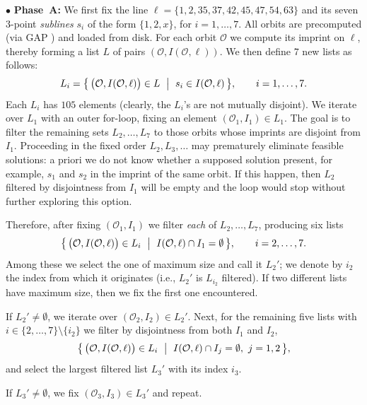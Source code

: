 \documentclass[a4paper, 11pt]{article}
\theoremstyle{definition}
\theoremstyle{definition}
\theoremstyle{definition}
\numberwithin{equation}{section}
\begin{document}
$\bullet$ \textbf{Phase~A:} We first fix the line
$\ell=\{1,2,35,37,42,45,47,54,63\}$ and its seven $3$-point \emph{sublines}
$s_i$ of the form $\{1,2,x\}$, for $i=1,\dots,7$.
All orbits are precomputed (via GAP \cite{Gap}) and loaded from disk. For each orbit $\mathcal{O}$ we
compute its imprint on $\ell$, thereby forming a list
$L$ of pairs $(\mathcal{O}, I(\mathcal{O},\ell))$.
We then define $7$ new lists as follows:
\begin{equation*}
	L_i=\bigl\{\,\big(\mathcal{O}, I (\mathcal{O},\ell) \big)\in L \ \bigm|\ s_i\in I(\mathcal{O},\ell)\,\bigr\},
	\qquad i=1,\dots,7.
\end{equation*}
Each $L_i$ has $105$ elements (clearly, the $L_i$'s are not mutually disjoint).
We iterate over $L_1$ with an outer for-loop, fixing an element
$(\mathcal{O}_1,I_1)\in L_1$. The goal is to filter the remaining sets
$L_2,\dots,L_7$ to those orbits whose imprints are disjoint from $I_1$.
Proceeding in the fixed order $L_2,L_3,\ldots$ may prematurely eliminate
feasible solutions: a priori we do not know whether a supposed solution present,
for example, $s_1$ and $s_2$ in the imprint of the same  orbit. If this happen, then
$L_2$ filtered by disjointness from $I_1$ will be empty and the loop would
stop without further exploring this option.

Therefore, after fixing $(\mathcal{O}_1,I_1)$ we filter \emph{each} of
$L_2,\dots,L_7$, producing six lists
\begin{equation*}
	\bigl\{\,\big(\mathcal{O}, I (\mathcal{O},\ell) \big)\in L_i \ \bigm|\ I(\mathcal{O},\ell)\cap I_1=\emptyset\,\bigr\},
	\qquad i=2,\dots,7.
\end{equation*}
Among these we select the one of maximum size and call it $L_2'$; we denote by
$i_2$ the index from which it originates (i.e., $L_2'$ is $L_{i_2}$ filtered).
If two different lists have maximum size, then we fix the first one encountered. 

If $L_2'\neq\emptyset$, we iterate over
$(\mathcal{O}_2,I_2)\in L_2'$. Next, for the remaining five lists with
$i\in\{2,\dots,7\}\setminus\{i_2\}$ we filter by disjointness from both $I_1$
and $I_2$,
\begin{equation*}
	\bigl\{\,\big(\mathcal{O}, I (\mathcal{O},\ell) \big)\in L_i \ \bigm|\ I(\mathcal{O},\ell)\cap I_j=\emptyset,\ j=1,2\,\bigr\},
\end{equation*}
and select the largest filtered list $L_3'$ with its index $i_3$. 

If $L_3'\neq\emptyset$, we fix $(\mathcal{O}_3,I_3)\in L_3'$ and repeat. 
\end{document}
